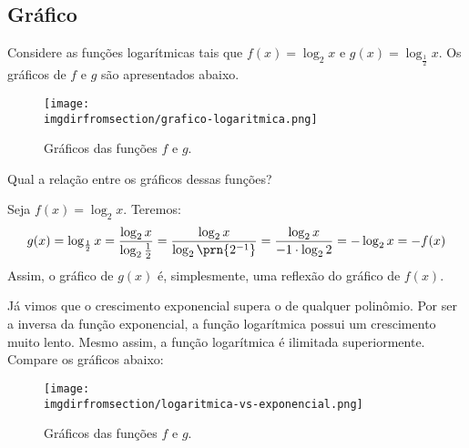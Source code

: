 \subsection{Gráfico}

\begin{example}
    Considere as funções logarítmicas tais que $f(x) = \log_2 x$ e $g(x) = \log_{\frac 1 2} x$. Os gráficos de $f$ e $g$ são apresentados abaixo.
    \begin{figure}[H]
        \centering
        \texttt{[image: \\imgdirfromsection/grafico-logaritmica.png]}
        \caption{Gráficos das funções $f$ e $g$.}
        \label{img:grafico-logaritmica}
    \end{figure}
\end{example}

Qual a relação entre os gráficos dessas funções?

\begin{solution}
    Seja $f(x) = \log_2 x$. Teremos:
    \[
        g(x) = \log_{\frac 1 2}{x}
        = \frac{\log_2 x}{\log_2 {\frac 1 2}}
        = \frac{\log_2 x}{\log_2 \prn{2^{-1}}}
        = \frac{\log_2 x}{-1\cdot\log_2 2}
        = -\log_2 x
        = -f(x)
    \]
    Assim, o gráfico de $g(x)$ é, simplesmente, uma reflexão do gráfico de $f(x)$.
\end{solution}

\begin{remark}
    Já vimos que o crescimento exponencial supera o de qualquer polinômio. Por ser a inversa da função exponencial, a função logarítmica possui um crescimento muito lento. Mesmo assim, a função logarítmica é ilimitada superiormente. Compare os gráficos abaixo:
\end{remark}

\begin{figure}[H]
    \centering
    \texttt{[image: \\imgdirfromsection/logaritmica-vs-exponencial.png]}
    \caption{Gráficos das funções $f$ e $g$.}
    \label{img:logaritmica-vs-exponencial}
\end{figure}

\begin{onlineact}
\end{onlineact}